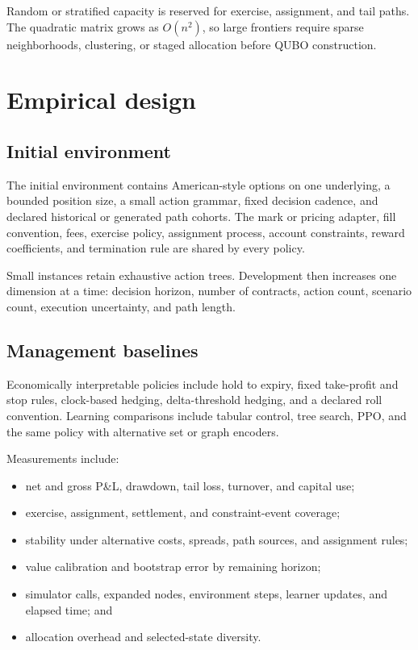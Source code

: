 \documentclass{strategynet-journal}
\begin{document}
\begin{SNcolumns}
Random or stratified capacity is reserved for exercise, assignment, and tail
paths.  The quadratic matrix grows as \(O(n^2)\), so large frontiers require
sparse neighborhoods, clustering, or staged allocation before QUBO
construction.

\section{Empirical design}
\label{sec:experiment}

\subsection{Initial environment}

The initial environment contains American-style options on one underlying,
a bounded position size, a small action grammar, fixed decision cadence, and
declared historical or generated path cohorts.  The mark or pricing adapter,
fill convention, fees, exercise policy, assignment process, account
constraints, reward coefficients, and termination rule are shared by every
policy.

Small instances retain exhaustive action trees.  Development then increases
one dimension at a time: decision horizon, number of contracts, action count,
scenario count, execution uncertainty, and path length.

\subsection{Management baselines}

Economically interpretable policies include hold to expiry, fixed
take-profit and stop rules, clock-based hedging, delta-threshold hedging, and
a declared roll convention.  Learning comparisons include tabular control,
tree search, PPO, and the same policy with alternative set or graph encoders.

Measurements include:

\begin{itemize}
  \item net and gross P\&L, drawdown, tail loss, turnover, and capital use;
  \item exercise, assignment, settlement, and constraint-event coverage;
  \item stability under alternative costs, spreads, path sources, and
        assignment rules;
  \item value calibration and bootstrap error by remaining horizon;
  \item simulator calls, expanded nodes, environment steps, learner updates,
        and elapsed time; and
  \item allocation overhead and selected-state diversity.
\end{itemize}


\end{SNcolumns}
\end{document}
